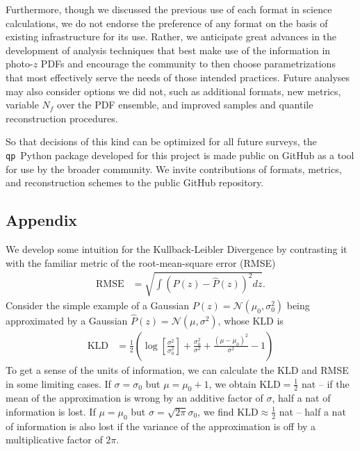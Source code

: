 \documentclass[\docopts]{\docclass}
\newcommand{\qp}{\texttt{qp}}
\newcommand{\pz}{photo-$z$ PDF}
\begin{document}
Furthermore, though we discussed the previous use of each format in science 
calculations, we do not endorse the preference of any format on the basis of 
existing infrastructure for its use.
Rather, we anticipate great advances in the development of analysis techniques 
that best make use of the information in \pz s and encourage the community to 
then choose parametrizations that most effectively serve the needs of those 
intended practices.
Future analyses may also consider options we did not, such as additional 
formats, new metrics, variable $N_{f}$ over the PDF ensemble, and improved 
samples and quantile reconstruction procedures.

So that decisions of this kind can be optimized for all future surveys, the 
\qp\ Python package developed for this project is made public on GitHub as a 
tool for use by the broader community.
We invite contributions of formats, metrics, and reconstruction schemes to the 
public GitHub repository.


\subsection*{Appendix}
\label{sec:kld}

We develop some intuition for the Kullback-Leibler Divergence by contrasting it 
with the familiar metric of the root-mean-square error (RMSE)
\begin{align}
  \label{eq:rmse}
  \mathrm{RMSE} &= \sqrt{\int (P(z) - \hat{P}(z))^{2} dz}.
\end{align}
Consider the simple example of a Gaussian $P(z) = \mathcal{N}(\mu_{0}, 
\sigma_{0}^{2})$ being approximated by a Gaussian $\hat{P}(z) = 
\mathcal{N}(\mu, \sigma^{2})$, whose KLD is
\begin{align}
  \label{eq:gaussian}
  \mathrm{KLD} &= 
\frac{1}{2}\left(\log\left[\frac{\sigma^{2}}{\sigma_{0}^{2}}\right] + 
\frac{\sigma_{0}^{2}}{\sigma^{2}} + \frac{(\mu-\mu_{0})^{2}}{\sigma^{2}} - 
1\right)
\end{align}
To get a sense of the units of information, we can calculate the KLD and RMSE 
in some limiting cases.
If $\sigma=\sigma_{0}$ but $\mu=\mu_{0}+1$, we obtain 
$\mathrm{KLD}=\frac{1}{2}$ nat -- if the mean of the approximation is wrong by 
an additive factor of $\sigma$, half a nat of information is lost.
If $\mu=\mu_{0}$ but $\sigma=\sqrt{2\pi}\sigma_{0}$, we find 
$\mathrm{KLD}\approx\frac{1}{2}$ nat -- half a nat of information is also lost 
if the variance of the approximation is off by a multiplicative factor of 
$2\pi$.
\end{document}
